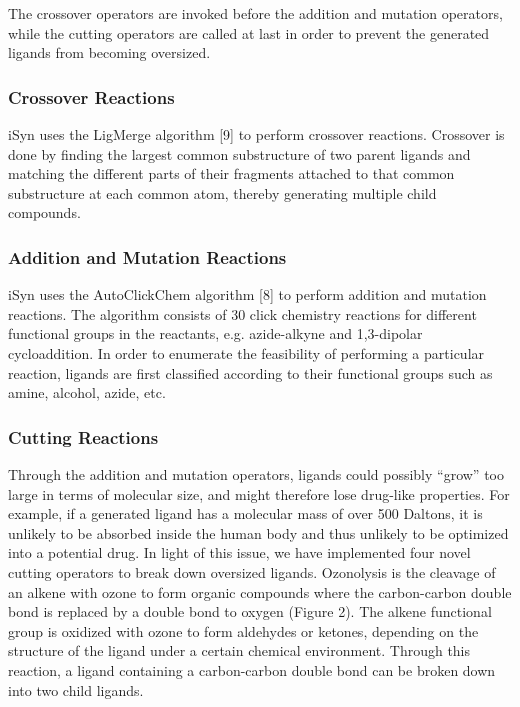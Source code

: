 The crossover operators are invoked before the addition and mutation operators, while the cutting operators are called at last in order to prevent the generated ligands from becoming oversized.

\subsubsection{Crossover Reactions}

iSyn uses the LigMerge algorithm [9] to perform crossover reactions. Crossover is done by finding the largest common substructure of two parent ligands and matching the different parts of their fragments attached to that common substructure at each common atom, thereby generating multiple child compounds.

\subsubsection{Addition and Mutation Reactions}

iSyn uses the AutoClickChem algorithm [8] to perform addition and mutation reactions. The algorithm consists of 30 click chemistry reactions for different functional groups in the reactants, e.g. azide-alkyne and 1,3-dipolar cycloaddition. In order to enumerate the feasibility of performing a particular reaction, ligands are first classified according to their functional groups such as amine, alcohol, azide, etc.

\subsubsection{Cutting Reactions}

Through the addition and mutation operators, ligands could possibly “grow” too large in terms of molecular size, and might therefore lose drug-like properties. For example, if a generated ligand has a molecular mass of over 500 Daltons, it is unlikely to be absorbed inside the human body and thus unlikely to be optimized into a potential drug. In light of this issue, we have implemented four novel cutting operators to break down oversized ligands.
Ozonolysis is the cleavage of an alkene with ozone to form organic compounds where the carbon-carbon double bond is replaced by a double bond to oxygen (Figure 2). The alkene functional group is oxidized with ozone to form aldehydes or ketones, depending on the structure of the ligand under a certain chemical environment. Through this reaction, a ligand containing a carbon-carbon double bond can be broken down into two child ligands.
 
